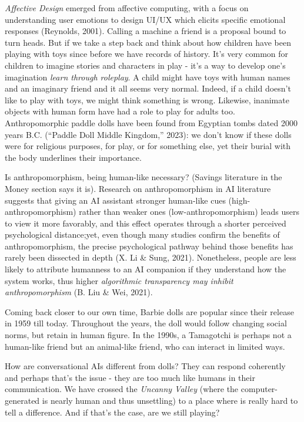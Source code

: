 \documentclass[
  12pt,
  letterpaper,
  DIV=11,
  numbers=noendperiod]{scrartcl}
\begin{document}
\emph{Affective Design} emerged from affective computing, with a focus
on understanding user emotions to design UI/UX which elicits specific
emotional responses (Reynolds, 2001). Calling a machine a friend is a
proposal bound to turn heads. But if we take a step back and think about
how children have been playing with toys since before we have records of
history. It's very common for children to imagine stories and characters
in play - it's a way to develop one's imagination \emph{learn through
roleplay}. A child might have toys with human names and an imaginary
friend and it all seems very normal. Indeed, if a child doesn't like to
play with toys, we might think something is wrong. Likewise, inanimate
objects with human form have had a role to play for adults too.
Anthropomorphic paddle dolls have been found from Egyptian tombs dated
2000 years B.C. ({``Paddle {Doll} {\textbar} {Middle Kingdom},''} 2023):
we don't know if these dolls were for religious purposes, for play, or
for something else, yet their burial with the body underlines their
importance.

Is anthropomorphism, being human-like necessary? (Savings literature in
the Money section says it is). Research on anthropomorphism in AI
literature suggests that giving an AI assistant stronger human-like cues
(high-anthropomorphism) rather than weaker ones (low-anthropomorphism)
leads users to view it more favorably, and this effect operates through
a shorter perceived psychological distance;yet, even though many studies
confirm the benefits of anthropomorphism, the precise psychological
pathway behind those benefits has rarely been dissected in depth (X. Li
\& Sung, 2021). Nonetheless, people are less likely to attribute
humanness to an AI companion if they understand how the system works,
thus higher \emph{algorithmic transparency may inhibit anthropomorphism}
(B. Liu \& Wei, 2021).

Coming back closer to our own time, Barbie dolls are popular since their
release in 1959 till today. Throughout the years, the doll would follow
changing social norms, but retain in human figure. In the 1990s, a
Tamagotchi is perhaps not a human-like friend but an animal-like friend,
who can interact in limited ways.

How are conversational AIs different from dolls? They can respond
coherently and perhaps that's the issue - they are too much like humans
in their communication. We have crossed the \emph{Uncanny Valley} (where
the computer-generated is nearly human and thus unsettling) to a place
where is really hard to tell a difference. And if that's the case, are
we still playing?
\end{document}
